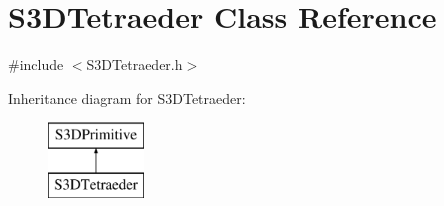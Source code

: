 \hypertarget{class_s3_d_tetraeder}{
\section{S3DTetraeder Class Reference}
\label{class_s3_d_tetraeder}
}


{\ttfamily \#include $<$S3DTetraeder.h$>$}

Inheritance diagram for S3DTetraeder:\begin{figure}[H]
\begin{center}
\leavevmode
\includegraphics[height=2cm]{class_s3_d_tetraeder}
\end{center}
\end{figure}
